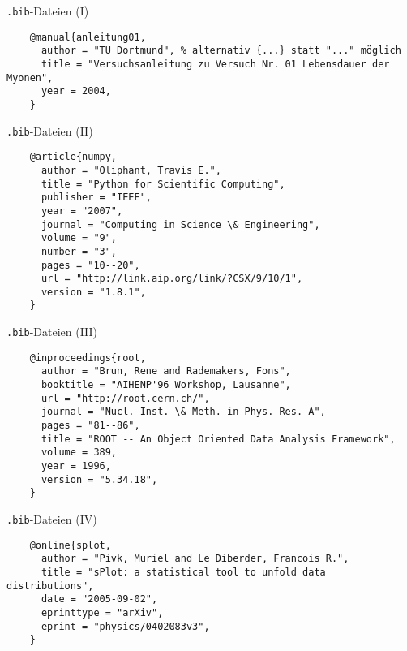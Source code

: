 \begin{frame}[fragile]{\texttt{.bib}-Dateien (I)}
  \begin{lstlisting}
    @manual{anleitung01,
      author = "TU Dortmund", % alternativ {...} statt "..." möglich
      title = "Versuchsanleitung zu Versuch Nr. 01 Lebensdauer der Myonen",
      year = 2004,
    }
  \end{lstlisting}
  \vspace{1em}
\end{frame}

\begin{frame}[fragile]{\texttt{.bib}-Dateien (II)}
  \begin{lstlisting}
    @article{numpy,
      author = "Oliphant, Travis E.",
      title = "Python for Scientific Computing",
      publisher = "IEEE",
      year = "2007",
      journal = "Computing in Science \& Engineering",
      volume = "9",
      number = "3",
      pages = "10--20",
      url = "http://link.aip.org/link/?CSX/9/10/1",
      version = "1.8.1",
    }
  \end{lstlisting}
  \vspace{1em}
\end{frame}

\begin{frame}[fragile]{\texttt{.bib}-Dateien (III)}
  \begin{lstlisting}
    @inproceedings{root,
      author = "Brun, Rene and Rademakers, Fons",
      booktitle = "AIHENP'96 Workshop, Lausanne",
      url = "http://root.cern.ch/",
      journal = "Nucl. Inst. \& Meth. in Phys. Res. A",
      pages = "81--86",
      title = "ROOT -- An Object Oriented Data Analysis Framework",
      volume = 389,
      year = 1996,
      version = "5.34.18",
    }
  \end{lstlisting}
  \vspace{1em}
\end{frame}

\begin{frame}[fragile]{\texttt{.bib}-Dateien (IV)}
  \begin{lstlisting}
    @online{splot,
      author = "Pivk, Muriel and Le Diberder, Francois R.",
      title = "sPlot: a statistical tool to unfold data distributions",
      date = "2005-09-02",
      eprinttype = "arXiv",
      eprint = "physics/0402083v3",
    }
  \end{lstlisting}
  \vspace{1em}
\end{frame}

